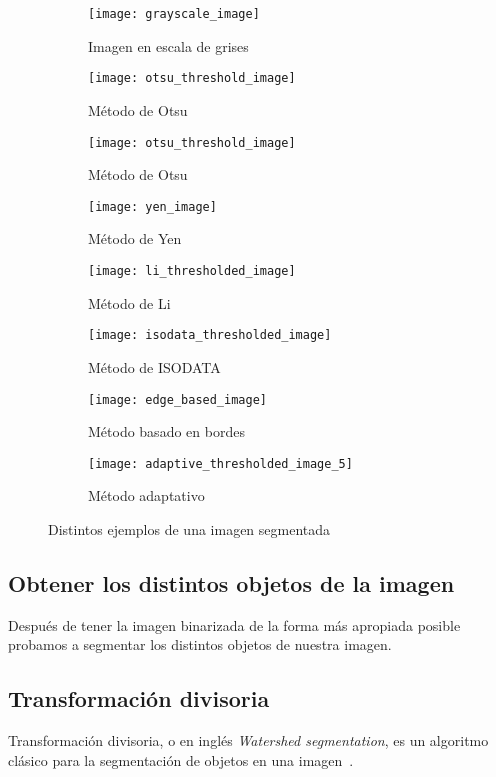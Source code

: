 \begin{figure}
	\centering
	\begin{subfigure}[b]{0.45\textwidth}
        \texttt{[image: grayscale\_image]}
        \caption{Imagen en escala de grises}
    \end{subfigure}
    \begin{subfigure}[b]{0.45\textwidth}
        \texttt{[image: otsu\_threshold\_image]}
        \caption{Método de Otsu}
    \end{subfigure}
    \begin{subfigure}[b]{0.45\textwidth}
        \texttt{[image: otsu\_threshold\_image]}
        \caption{Método de Otsu}
    \end{subfigure}
    \begin{subfigure}[b]{0.45\textwidth}
        \texttt{[image: yen\_image]}
        \caption{Método de Yen}
    \end{subfigure}
    \begin{subfigure}[b]{0.45\textwidth}
        \texttt{[image: li\_thresholded\_image]}
        \caption{Método de Li}
    \end{subfigure}
    \begin{subfigure}[b]{0.45\textwidth}
        \texttt{[image: isodata\_thresholded\_image]}
        \caption{Método de ISODATA}    
    \end{subfigure}
    \begin{subfigure}[b]{0.45\textwidth}
        \texttt{[image: edge\_based\_image]}
        \caption{Método basado en bordes}    
    \end{subfigure}
    \begin{subfigure}[b]{0.45\textwidth}
        \texttt{[image: adaptive\_thresholded\_image\_5]}
        \caption{Método adaptativo}    
    \end{subfigure}
    \caption{Distintos ejemplos de una imagen segmentada}
	\label{fig:5.1.2}
\end{figure} 

\subsection{Obtener los distintos objetos de la imagen}
Después de tener la imagen binarizada de la forma más apropiada posible probamos a segmentar los distintos objetos de nuestra imagen.

\subsection{Transformación divisoria}
Transformación divisoria, o en inglés \textit{Watershed segmentation}, es un algoritmo clásico para la segmentación de objetos en una imagen~\cite{wiki:watershed}.

